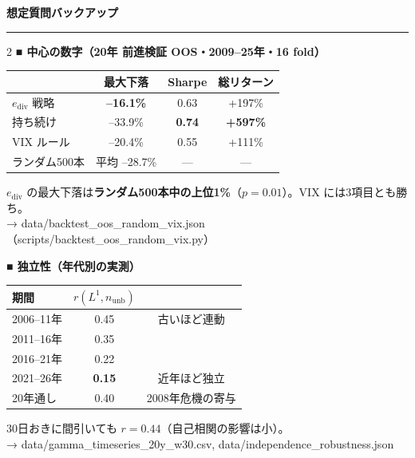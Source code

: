 \documentclass[9pt,a4paper]{article}
\newcommand{\ediv}{e_{\mathrm{div}}}
\newcommand{\nunb}{n_{\mathrm{unb}}}
\begin{document}
{\large\textbf{想定質問バックアップ}}

\vspace{1mm}\hrule\vspace{2mm}

\begin{multicols}{2}
{\color{accent}\textbf{■ 中心の数字（20年 前進検証 OOS・2009--25年・16 fold）}}\par\smallskip
{\small
\begin{tabular}{@{}lccc@{}}
\toprule
 & 最大下落 & Sharpe & 総リターン\\
\midrule
$\ediv$ 戦略 & \textbf{--16.1\%} & 0.63 & +197\%\\
持ち続け & --33.9\% & \textbf{0.74} & \textbf{+597\%}\\
VIX ルール & --20.4\% & 0.55 & +111\%\\
ランダム500本 & 平均 --28.7\% & --- & ---\\
\bottomrule
\end{tabular}\par\smallskip
$\ediv$ の最大下落は\textbf{ランダム500本中の上位1\%}（$p=0.01$）。VIX には3項目とも勝ち。\\
{\color{muted}→ data/backtest\_oos\_random\_vix.json （scripts/backtest\_oos\_random\_vix.py）}
}

\vspace{2mm}
{\color{accent}\textbf{■ 独立性（年代別の実測）}}\par\smallskip
{\small
\begin{tabular}{@{}lcc@{}}
\toprule
期間 & $r(L^1,\nunb)$ & \\
\midrule
2006--11年 & 0.45 & 古いほど連動\\
2011--16年 & 0.35 & \\
2016--21年 & 0.22 & \\
2021--26年 & \textbf{0.15} & 近年ほど独立\\
20年通し & 0.40 & 2008年危機の寄与\\
\bottomrule
\end{tabular}\par\smallskip
30日おきに間引いても $r=0.44$（自己相関の影響は小）。\\
{\color{muted}→ data/gamma\_timeseries\_20y\_w30.csv, data/independence\_robustness.json}
}


\end{multicols}
\end{document}
